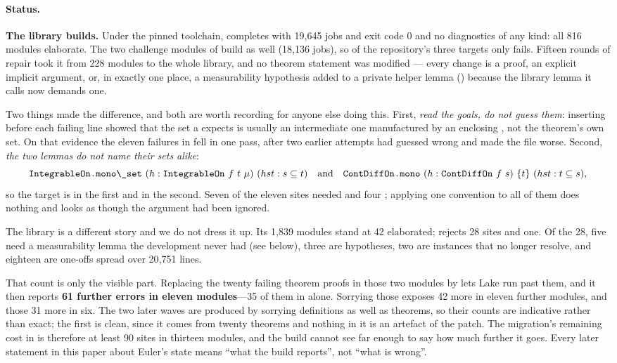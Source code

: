 \paragraph{Status.} \textbf{The  library builds.} Under the pinned
toolchain,  completes with 19{,}645 jobs and exit code $0$ and no
diagnostics of any kind: all 816 modules elaborate. The two challenge modules of
 build as well (18{,}136 jobs), so of the repository's three
targets only  fails. Fifteen rounds of repair took it from 228
modules to the whole library, and no theorem statement was modified --- every change is a
proof, an explicit implicit argument, or, in exactly one place, a measurability hypothesis
added to a private helper lemma () because the library lemma it calls now
demands one.

Two things made the difference, and both are worth recording for anyone else doing this.
First, \emph{read the goals, do not guess them}: inserting  before each
failing line showed that the set a  expects is usually an intermediate one
manufactured by an enclosing , not the theorem's own set. On that evidence the
eleven failures in  fell in one pass, after two earlier attempts had
guessed wrong and made the file worse. Second, \emph{the two  lemmas do not name
their sets alike}:
\[
  \lean{IntegrableOn.mono\_set}\ (h : \lean{IntegrableOn}\ f\ t\ \mu)\ (hst : s \subseteq t)
  \quad\text{and}\quad
  \lean{ContDiffOn.mono}\ (h : \lean{ContDiffOn}\ f\ s)\ \{t\}\ (hst : t \subseteq s),
\]
so the target is  in the first and  in the second. Seven of the eleven sites
needed  and four ; applying one convention to all of them
does nothing and looks as though the argument had been ignored.

The  library is a different story and we do not dress it up. Its 1{,}839 modules
stand at 42 elaborated;  rejects 28 sites and
 one. Of the 28, five need a measurability lemma the
development never had (see below), three are  hypotheses, two are
 instances that no longer resolve, and eighteen are one-offs spread over
20{,}751 lines.

That count is only the visible part. Replacing the twenty failing theorem proofs in those
two modules by  lets Lake run past them, and it then reports \textbf{61 further
errors in eleven modules}---35 of them in  alone. Sorrying
those exposes 42 more in eleven further modules, and those 31 more in six. The two later
waves are produced by sorrying definitions as well as theorems, so their counts are
indicative rather than exact; the first is clean, since it comes from twenty theorems and
nothing in it is an artefact of the patch. The migration's remaining cost in  is
therefore at least 90 sites in thirteen modules, and the build cannot see far enough to say
how much further it goes. Every later statement in this paper about Euler's state means
``what the build reports'', not ``what is wrong''.

